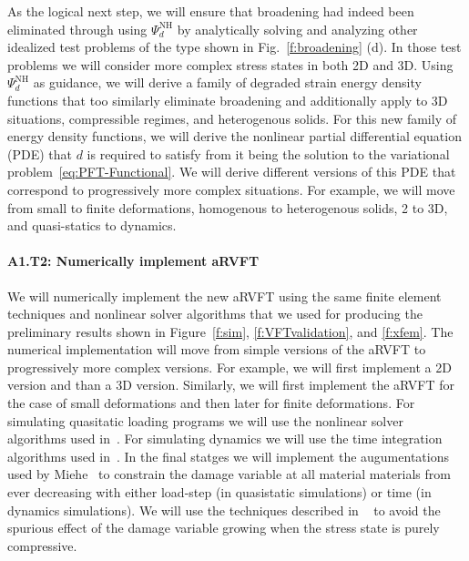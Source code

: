 \documentclass[10pt,letterpaper]{article}
\begin{document}
    As the logical next step, we will ensure that  broadening had  indeed been  eliminated through using $\mathsf{\Psi}_d^{\text{NH}}$  by analytically solving and analyzing  other idealized test problems of the type shown  in Fig.~\ref{f:broadening} (d). In those test problems we will consider  more complex stress states in both 2D and  3D. Using $\mathsf{\Psi}_d^{\text{NH}}$ as guidance,  we will derive a family of degraded strain energy density functions that too similarly eliminate broadening and additionally  apply to  3D situations, compressible regimes, and  heterogenous solids.  For  this  new family of  energy density functions, we will derive the nonlinear partial differential equation (PDE) that $d$ is  required to satisfy from it being the solution to the variational problem~\eqref{eq:PFT-Functional}. We will derive different versions of this PDE that correspond to  progressively more complex situations. For example, we will  move from small  to finite deformations, homogenous to heterogenous solids, 2 to 3D, and quasi-statics to dynamics.%




    \paragraph{A1.T2: Numerically implement aRVFT}
    We will numerically implement the new aRVFT using the same finite element techniques and nonlinear solver algorithms that we used for producing the preliminary results shown in Figure~\ref{f:sim}, \ref{f:VFTvalidation}, and \ref{f:xfem}.  The numerical implementation will move  from simple versions of the aRVFT to  progressively more complex versions.  For example, we will first implement a  2D version and than a 3D version.  Similarly, we will first implement the aRVFT for the case of small deformations and then later for finite deformations.   For simulating quasitatic loading programs we will use the nonlinear solver algorithms  used in~\cite{Ask_Kaushik}. For   simulating dynamics we  will use the time integration algorithms used in~\cite{Ask_Kaushik}. In the final statges  we will implement the augumentations used by Miehe~\cite{miehe2010phase} to constrain the damage variable at all material  materials from ever decreasing with either   load-step (in quasistatic simulations) or time (in dynamics simulations). We will use the techniques described in ~\cite{Aks_Kaushik}  to  avoid the spurious effect of the damage variable growing  when the stress state is purely compressive.%
\end{document}

